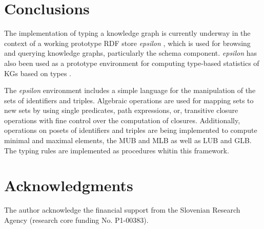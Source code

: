 \documentclass[runningheads]{llncs}
\newcommand{\epsln}{\emph{epsilon} }
\begin{document}
\section{Conclusions\label{sec:conclude}}

The implementation of typing a knowledge graph is currently underway
in the context of a working prototype RDF store \epsln
\cite{epsilon2025}, which is used for browsing and querying knowledge
graphs, particularly the schema component. \epsln has also been used
as a prototype environment for computing type-based statistics of KGs
based on types \cite{Savnik2025}.

The \epsln environment includes a simple language for the manipulation
of the sets of identifiers and triples. Algebraic operations are
used for mapping sets to new sets by using single predicates, path
expressions, or, transitive closure operations with fine control over
the computation of closures. Additionally, operations on posets of
identifiers and triples are being implemented to compute minimal and
maximal elements, the MUB and MLB as well as LUB and GLB. The
typing rules are implemented as procedures whitin this framework.


\section{Acknowledgments}
The author acknowledge the financial support from the Slovenian
Research Agency (research core funding No. P1-00383).




\end{document}
